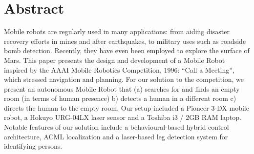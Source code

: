 \documentclass{article}
\begin{document}
    \section{Abstract}
		Mobile robots are regularly used in many applications: from aiding disaster recovery efforts in mines and after earthquakes, to military uses such as roadside bomb detection. Recently, they have even been employed to explore the surface of Mars. This paper presents the design and development of a Mobile Robot inspired by the AAAI Mobile Robotics Competition, 1996: “Call a Meeting”, which stressed navigation and planning.  For our solution to the competition, we present an autonomous Mobile Robot that (a) searches for and finds an empty room (in terms of human presence) b) detects a human in a different room c) directs the human to the empty room. Our setup included a Pioneer 3-DX mobile robot, a Hokuyo URG-04LX laser sensor and a Toshiba i3 / 2GB RAM laptop. Notable features of our solution include a behavioural-based hybrid control architecture, ACML localization and a laser-based leg detection system for identifying persons.
\end{document}
